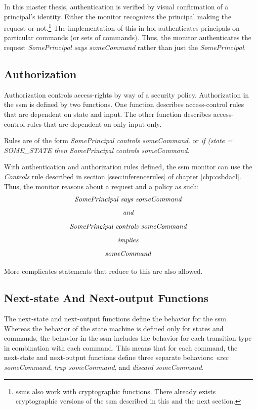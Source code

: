 \documentclass[../../main/main.tex]{subfiles}
\begin{document}
In this master thesis, authentication is verified by visual confirmation of a principal's identity.  Either the monitor recognizes the principal making the request or not.\footnote{\glspl{ssm} also work with cryptographic functions. There already exists cryptographic versions of the \gls{ssm} described in this and the next section.}  The implementation of this in \gls{hol} authenticates principals on particular commands (or sets of commands).  Thus, the monitor authenticates the request \textit{SomePrincipal says someCommand} rather than just the \textit{SomePrincipal}. 


\subsection{Authorization}
Authorization controls access-rights by way of a security policy.  Authorization in the \gls{ssm} is defined by two functions.  One function describes access-control rules that are dependent on state and input.  The other function describes access-control rules that are dependent on only input only.  

Rules are of the form \textit{SomePrincipal controls someCommand}.  or \textit{if (state = SOME_STATE then SomePrincipal controls someCommand}.

With authentication and authorization rules defined, the \gls{ssm} monitor can use the \textit{Controls} rule described in section \ref{ssec:inferencerules} of chapter \ref{chp:csbdacl}.  Thus, the monitor reasons about a request and a policy as such:
\[\text{\textit{SomePrincipal says someCommand}}\]
\[\text{\textit{and}}\]
\[\text{\textit{SomePrincipal controls someCommand}}\]
\[\text{\textit{implies}}\]
\[\text{\textit{someCommand}}\]

More complicates statements that reduce to this are also allowed.

\subsection{Next-state And Next-output Functions}
The next-state and next-output functions define the behavior for the \gls{ssm}.  Whereas the behavior of the state machine is defined only for states and commands, the behavior in the \gls{ssm} includes the behavior for each transition type in combination with each command.  This means that for each command, the next-state and next-output functions define three separate behaviors: \textit{exec someCommand}, \textit{trap someCommand}, and \textit{discard someCommand}.  
\end{document}
